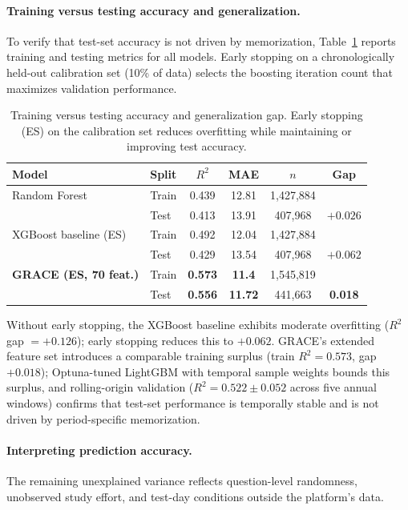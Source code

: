 \documentclass[11pt]{article}
\begin{document}
\paragraph{Training versus testing accuracy and generalization.}
To verify that test-set accuracy is not driven by memorization,
Table~\ref{tab:generalization} reports training and testing metrics for all models.
Early stopping on a chronologically held-out calibration set (10\% of data)
selects the boosting iteration count that maximizes validation performance.

\begin{table}[ht]
\centering
\caption{Training versus testing accuracy and generalization gap.
Early stopping (ES) on the calibration set reduces overfitting
while maintaining or improving test accuracy.}
\label{tab:generalization}
\small
\begin{tabular}{@{}llcccc@{}}
\toprule
\textbf{Model} & \textbf{Split} & $R^{2}$ & \textbf{MAE} & $n$ & \textbf{Gap} \\
\midrule
Random Forest & Train & 0.439 & 12.81 & 1,427,884 & \\
 & Test & 0.413 & 13.91 & 407,968 & $+0.026$ \\
\addlinespace
XGBoost baseline (ES) & Train & 0.492 & 12.04 & 1,427,884 & \\
 & Test & 0.429 & 13.54 & 407,968 & $+0.062$ \\
\addlinespace
\textbf{GRACE (ES, 70 feat.)} & Train & \textbf{0.573} & \textbf{11.4} & 1,545,819 & \\
 & Test & \textbf{0.556} & \textbf{11.72} & 441,663 & \textbf{0.018} \\
\bottomrule
\end{tabular}
\end{table}

Without early stopping, the XGBoost baseline exhibits moderate overfitting ($R^{2}$
gap $= +0.126$); early stopping reduces this to $+0.062$.
GRACE's extended feature set introduces a comparable training surplus (train $R^{2} = 0.573$,
gap $+0.018$); Optuna-tuned LightGBM with temporal sample weights bounds this surplus,
and rolling-origin validation ($R^{2} = 0.522 \pm 0.052$ across five annual windows)
confirms that test-set performance is temporally stable and is not driven by
period-specific memorization.

\paragraph{Interpreting prediction accuracy.}
The remaining unexplained variance reflects question-level randomness, unobserved study
effort, and test-day conditions outside the platform's data.
\end{document}
